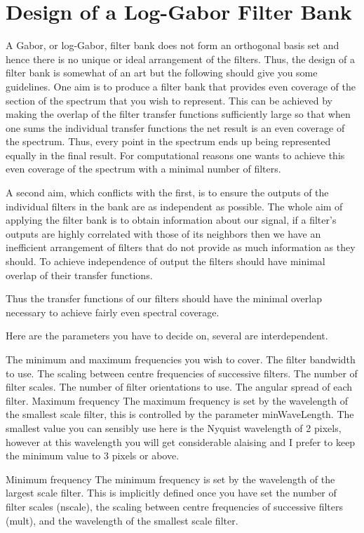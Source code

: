 \chapter{Design of a Log-Gabor Filter Bank} \label{apx_logGabor}
A Gabor, or log-Gabor, filter bank does not form an orthogonal basis
set and hence there is no unique or ideal arrangement of the
filters. Thus, the design of a filter bank is somewhat of an art but
the following should give you some guidelines. One aim is to produce
a filter bank that provides even coverage of the section of the
spectrum that you wish to represent. This can be achieved by making
the overlap of the filter transfer functions sufficiently large so
that when one sums the individual transfer functions the net result
is an even coverage of the spectrum. Thus, every point in the
spectrum ends up being represented equally in the final result. For
computational reasons one wants to achieve this even coverage of the
spectrum with a minimal number of filters.

A second aim, which conflicts with the first, is to ensure the
outputs of the individual filters in the bank are as independent as
possible. The whole aim of applying the filter bank is to obtain
information about our signal, if a filter's outputs are highly
correlated with those of its neighbors then we have an inefficient
arrangement of filters that do not provide as much information as
they should. To achieve independence of output the filters should
have minimal overlap of their transfer functions.

Thus the transfer functions of our filters should have the minimal
overlap necessary to achieve fairly even spectral coverage.

Here are the parameters you have to decide on, several are
interdependent.

The minimum and maximum frequencies you wish to cover. The filter
bandwidth to use. The scaling between centre frequencies of
successive filters. The number of filter scales. The number of
filter orientations to use. The angular spread of each filter.
Maximum frequency The maximum frequency is set by the wavelength of
the smallest scale filter, this is controlled by the parameter
minWaveLength. The smallest value you can sensibly use here is the
Nyquist wavelength of 2 pixels, however at this wavelength you will
get considerable alaising and I prefer to keep the minimum value to
3 pixels or above.

Minimum frequency The minimum frequency is set by the wavelength of
the largest scale filter. This is implicitly defined once you have
set the number of filter scales (nscale), the scaling between centre
frequencies of successive filters (mult), and the wavelength of the
smallest scale filter.

